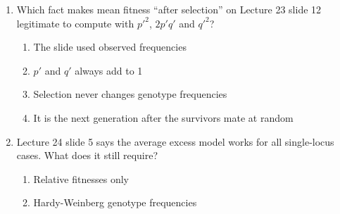 \documentclass[11pt]{article}
\begin{document}
\begin{enumerate}[label=\textbf{\arabic*.}, leftmargin=2em, itemsep=1.4em]
\par\smallskip
\begin{enumerate}[label={}, leftmargin=2.4em, labelwidth=0pt, itemsep=2pt, topsep=0pt]
\item \hspace*{-2.4em}At equilibrium \(p \cdot s_1\) = \(q \cdot s_2\), so the allele with the more harmful homozygote must be rarer
\item \hspace*{-2.4em}It is a convention with no reason
\item \hspace*{-2.4em}Because \(s_1\) is always larger
\item \hspace*{-2.4em}Because the heterozygote has \(s\) = 0
\end{enumerate}
\item Which fact makes mean fitness ``after selection'' on Lecture 23 slide 12 legitimate to compute with \(p'^{2}\), \(2p'q'\) and \(q'^{2}\)?
\par\smallskip
\begin{enumerate}[label={}, leftmargin=2.4em, labelwidth=0pt, itemsep=2pt, topsep=0pt]
\item \hspace*{-2.4em}The slide used observed frequencies
\item \hspace*{-2.4em}\(p'\) and \(q'\) always add to 1
\item \hspace*{-2.4em}Selection never changes genotype frequencies
\item \hspace*{-2.4em}It is the next generation after the survivors mate at random
\end{enumerate}
\item Lecture 24 slide 5 says the average excess model works for all single-locus cases. What does it still require?
\par\smallskip
\begin{enumerate}[label={}, leftmargin=2.4em, labelwidth=0pt, itemsep=2pt, topsep=0pt]
\item \hspace*{-2.4em}Relative fitnesses only
\item \hspace*{-2.4em}Hardy-Weinberg genotype frequencies

\end{enumerate}
\end{enumerate}
\end{document}
